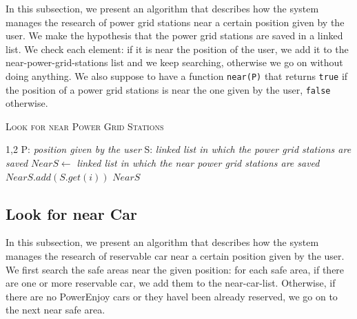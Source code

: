 In this subsection, we present an algorithm that describes how the system manages the research of power grid stations near a certain position given by the user. 
We make the hypothesis that the power grid stations are saved in a linked list.
We check each element: if it is near the position of the user, we add it to the near-power-grid-stations list and we keep searching, otherwise we go on without doing anything.
We also suppose to have a function \texttt{near(P)} that returns \texttt{true} if the position of a power grid stations is near the one given by the user, \texttt{false} otherwise.

\vspace{80pt}
\begin{algorithm}[h!tb]
\caption{\textsc{Look for near Power Grid Stations}}
\label{alg:near-stations}
\begin{algorithmic}[1]
\begin{spacing}{1,2}
\State P: \textit{position given by the user }
\State S: \textit{linked list in which the power grid stations are saved}
\State $NearS \leftarrow $ \textit{linked list in which the near power grid stations are saved}
		\State $NearS.add(S.get(i))$
	\EndIf
\EndFor
\State\Return $NearS$
\EndFunction
\end{spacing}
\end{algorithmic}
\end{algorithm}

\clearpage

\subsection{Look for near Car} \label{subsec:near-car}

In this subsection, we present an algorithm that describes how the system manages the research of reservable car near a certain position given by the user. 
We first search the safe areas near the given position: for each safe area, if there are one or more reservable car, we add them to the near-car-list. Otherwise, if there are no PowerEnjoy cars or they havel been already reserved, we go on to the next near safe area.

